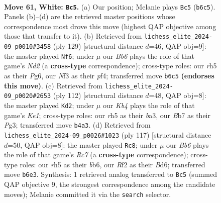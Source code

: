 \documentclass[11pt]{article}
\begin{document}
\clearpage

\begin{figure}[p]\centering
\begin{subfigure}{0.46\textwidth}\centering
\resizebox{\linewidth}{!}{%
\newchessgame
\chessboard[
  setfen={8/1B1k4/1B6/7r/PK4b1/1P3N1p/5R2/8 w - - 0 61},
  showmover=false,
  pgfstyle=straightmove, color=movearrow, markmove={b6-c5}
]}
\caption{}
\end{subfigure}\hfill
\begin{subfigure}{0.46\textwidth}\centering
\resizebox{\linewidth}{!}{%
\newchessgame
\chessboard[
  setfen={8/3n1k2/3K2p1/5p2/5Pr1/4B3/5R2/8 b - - 3 65},
  showmover=false,
  pgfstyle=straightmove, color=movearrow, markmove={d7-f6}
]}
\caption{}
\end{subfigure}
\\[4pt]
\begin{subfigure}{0.46\textwidth}\centering
\resizebox{\linewidth}{!}{%
\newchessgame
\chessboard[
  setfen={8/5B2/3r2p1/4k3/2R5/b2p2P1/5P2/4K3 w - - 11 57},
  showmover=false,
  pgfstyle=straightmove, color=movearrow, markmove={e1-d2}
]}
\caption{}
\end{subfigure}\hfill
\begin{subfigure}{0.46\textwidth}\centering
\resizebox{\linewidth}{!}{%
\newchessgame
\chessboard[
  setfen={8/P7/1B1bp1kp/1R6/1p5p/8/2r5/7K b - - 0 59},
  showmover=false,
  pgfstyle=straightmove, color=movearrow, markmove={c2-c8}
]}
\caption{}
\end{subfigure}
\caption{\textbf{Move 61, White: \texttt{Bc5}.} (a) Our position; Melanie plays \texttt{Bc5} (\texttt{b6c5}). Panels (b)--(d) are the retrieved master positions whose correspondence most drove this move (highest QAP objective among those that transfer to it). (b) Retrieved from \texttt{lichess\_elite\_2024-09\_p0010\#3458} (ply 129) [structural distance $d$=46, QAP obj=9]: the master played \texttt{Nf6}; under $\mu$ our \emph{Bb6} plays the role of that game's \emph{Nd2} (a \textbf{cross-type} correspondence); cross-type roles: our \emph{r}h5 as their \emph{P}g6, our \emph{N}f3 as their \emph{p}f4; transferred move \texttt{b6c5} \textbf{(endorses this move)}. (c) Retrieved from \texttt{lichess\_elite\_2024-09\_p0020\#2653} (ply 112) [structural distance $d$=48, QAP obj=8]: the master played \texttt{Kd2}; under $\mu$ our \emph{Kb4} plays the role of that game's \emph{Ke1}; cross-type roles: our \emph{r}h5 as their \emph{b}a3, our \emph{B}b7 as their \emph{P}g3; transferred move \texttt{b4a3}. (d) Retrieved from \texttt{lichess\_elite\_2024-09\_p0026\#1023} (ply 117) [structural distance $d$=50, QAP obj=8]: the master played \texttt{Rc8}; under $\mu$ our \emph{Bb6} plays the role of that game's \emph{Rc7} (a \textbf{cross-type} correspondence); cross-type roles: our \emph{r}h5 as their \emph{b}b6, our \emph{R}f2 as their \emph{B}d6; transferred move \texttt{b6e3}. Synthesis: 1 retrieved analog transferred to \texttt{Bc5} (summed QAP objective 9, the strongest correspondence among the candidate moves); Melanie committed it via the \texttt{search} selector.}
\label{fig:thought-m120}
\end{figure}
\end{document}
